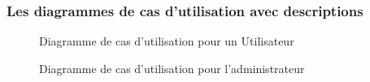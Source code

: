 \documentclass[12pt]{report}
\begin{document}
\subsubsection{\large{Les diagrammes de cas d'utilisation avec descriptions}}

\vspace{0.1in}

\begin{figure}[h]
\centering
  \vspace{-0.1in}
    \centerline{}
    \caption{Diagramme de cas d'utilisation pour un Utilisateur}
\end{figure}

\newpage

\begin{figure}[h]
\centering
    \centerline{}
    \caption{Diagramme de cas d'utilisation pour l'administrateur}
\end{figure}
\end{document}
